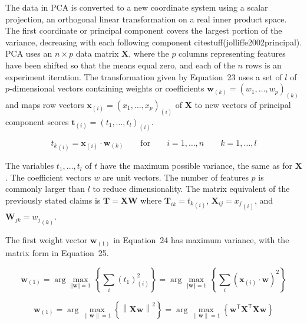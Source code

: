 \documentclass[preprint,12pt]{elsarticle}
\begin{document}
The data in PCA is converted to a new coordinate system using a scalar projection, an orthogonal linear transformation on a real inner product space. The first coordinate or principal component covers the largest portion of the variance, decreasing with each following component citestuff(jolliffe2002principal).
PCA uses an $n\times p$ data matrix $\mathbf{X}$, where the $p$ columns representing features have been shifted so that the means equal zero, and each of the $n$ rows is an experiment iteration.
The transformation given by Equation~23 uses a set of $l$ of $p$-dimensional vectors containing weights or coefficients $\mathbf{w}_{\left(k\right)}=(w_{1},\dots ,w_{p})_{\left(k\right)}$ and maps row vectors $\mathbf{x}_{\left(i\right)}=(x_{1},\dots ,x_{p})_{\left(i\right)}$ of $\mathbf{X}$ to new vectors of principal component scores $\mathbf{t}_{\left(i\right)}=(t_{1},\dots ,t_{l})_{\left(i\right)}$.

\begin{equation}
	{t_{k}}_{\left(i\right)}=\mathbf{x}_{\left(i\right)}\cdot \mathbf{w}_{\left(k\right)}\qquad \mathrm{for} \qquad i=1,\dots ,n\qquad k=1,\dots ,l
	\label{eqn:23}
\end{equation}

The variables $t_{1},\dots ,t_{l}$ of $t$ have the maximum possible variance, the same as for $\mathbf{X}$. The coefficient vectors $w$ are unit vectors. The number of features $p$ is commonly larger than $l$ to reduce dimensionality. The matrix equivalent of the previously stated claims is $\mathbf{T}=\mathbf{X} \mathbf{W}$ where ${\mathbf{T}}_{ik}={t_{k}}_{\left(i\right)}$, ${\mathbf{X}}_{ij}={x_{j}}_{\left(i\right)}$, and ${\mathbf{W}}_{jk}={w_{j}}_{\left(k\right)}$.

The first weight vector $\mathbf{w}_{\left(1\right)}$ in Equation~24 has maximum variance, with the matrix form in Equation~25.

\begin{equation}
	\mathbf{w}_{\left(1\right)}=\arg \max_{\Vert \mathbf{w} \Vert =1}\,\left\{\sum_{i}(t_{1})_{\left(i\right)}^{2}\right\}=\arg \max_{\Vert \mathbf{w} \Vert =1}\,\left\{\sum_{i}\left(\mathbf{x}_{\left(i\right)}\cdot \mathbf{w} \right)^{2}\right\}
	\label{eqn:24}
\end{equation}

\begin{equation}
	\mathbf{w}_{\left(1\right)}=\arg \max_{\left\|\mathbf{w} \right\|=1}\left\{\left\|\mathbf{Xw} \right\|^{2}\right\}=\arg \max_{\left\|\mathbf{w} \right\|=1}\left\{\mathbf{w}^{\mathsf{T}}\mathbf{X}^{\mathsf{T}}\mathbf{Xw} \right\}
	\label{eqn:25}
\end{equation}
\end{document}
